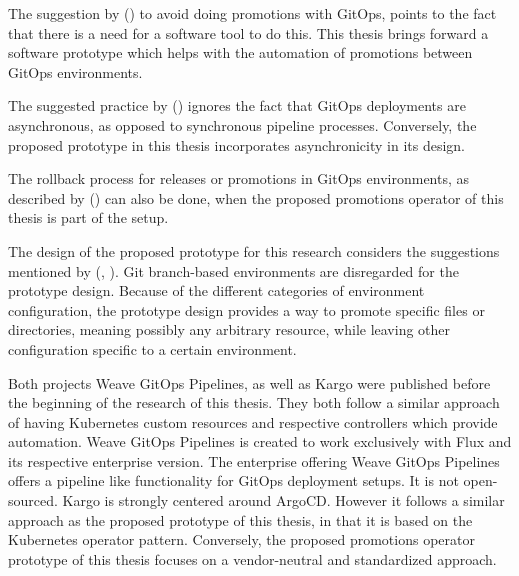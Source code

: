 
The suggestion by \citeauthor{gitopsCloudnativeCDInnoq} (\citeyear{gitopsCloudnativeCDInnoq})
to avoid doing promotions with GitOps,
points to the fact that there is a need for a software tool
to do this. This thesis brings forward a software prototype
which helps with the automation of promotions between GitOps environments.

The suggested practice by \citeauthor{gitopsAndKubernetes2021continuous} (\citeyear{gitopsAndKubernetes2021continuous})
ignores the fact that GitOps deployments are asynchronous,
as opposed to synchronous pipeline processes.
Conversely, the proposed prototype in this thesis incorporates asynchronicity
in its design.

The rollback process for releases or promotions in GitOps environments,
as described by
\citeauthor{gitopsAndKubernetes2021continuous} (\citeyear{gitopsAndKubernetes2021continuous})
can also be done, when the proposed promotions operator
of this thesis is part of the setup.

The design of the proposed prototype for this research
considers the suggestions mentioned by
\citeauthor{codefreshHowToModelGitOpsEnvironmentsAndPromote} (\citeyear{codefreshStopUsingBranchesGitOpsEnvironments}, \citeyear{codefreshHowToModelGitOpsEnvironmentsAndPromote}).
Git branch-based environments are disregarded for the prototype design.
Because of the different categories of environment configuration,
the prototype design provides a way to promote specific files or directories,
meaning possibly any arbitrary resource,
while leaving other configuration specific to a certain environment.

Both projects Weave GitOps Pipelines, as well as Kargo
were published before the beginning of the research of this thesis.
They both follow a similar approach of having Kubernetes custom resources and respective
controllers which provide automation.
Weave GitOps Pipelines is created to work exclusively with Flux and its respective enterprise version.
The enterprise offering Weave GitOps Pipelines offers a pipeline like functionality
for GitOps deployment setups. It is not open-sourced.
Kargo is strongly centered around ArgoCD. However
it follows a similar approach as the proposed prototype of this thesis,
in that it is based on the Kubernetes operator pattern.
Conversely, the proposed promotions operator prototype of this thesis
focuses on a vendor-neutral and standardized approach.












